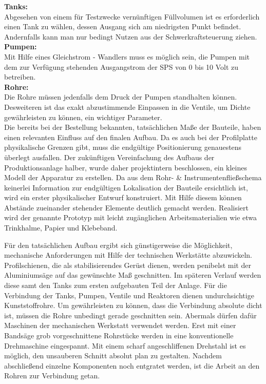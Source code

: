 	\textbf{Tanks:}\\
	Abgesehen von einem für Testzwecke vernünftigen Füllvolumen ist es erforderlich einen Tank zu wählen, dessen Ausgang sich am niedrigsten Punkt befindet. Andernfalls kann man nur bedingt Nutzen aus der Schwerkraftsteuerung ziehen.\\
	
	\textbf{Pumpen:}\\
	Mit Hilfe eines Gleichstrom - Wandlers muss es möglich sein, die Pumpen mit dem zur Verfügung stehenden Ausgangstrom der SPS von 0 bis 10 Volt zu betreiben.\\
	
	\textbf{Rohre:}\\
	Die Rohre müssen jedenfalls dem Druck der Pumpen standhalten können. Desweiteren ist das exakt abzustimmende Einpassen in die Ventile, um Dichte gewährleisten zu können, ein wichtiger Parameter.\\

	Die bereits bei der Bestellung bekannten, tatsächlichen Maße der Bauteile, haben einen relevanten Einfluss auf den finalen Aufbau. Da es auch bei der Profilplatte physikalische Grenzen gibt, muss die endgültige Positionierung genauestens überlegt ausfallen. Der zukünftigen Vereinfachung des Aufbaus der Produktionsanlage halber, wurde daher projektintern beschlossen, ein kleines Modell der Apparatur zu erstellen. Da aus dem Rohr- \& Instrumentenfließschema keinerlei Information zur endgültigen Lokalisation der Bauteile ersichtlich ist, wird ein erster physikalischer Entwurf konstruiert. Mit Hilfe diesem können Abstände zueinander stehender Elemente deutlich gemacht werden. Realisiert wird der genannte Prototyp mit leicht zugänglichen Arbeitsmaterialien wie etwa Trinkhalme, Papier und Klebeband.\\
	

	Für den tatsächlichen Aufbau ergibt sich günstigerweise die Möglichkeit, mechanische Anforderungen mit Hilfe der technischen Werkstätte abzuwickeln. Profilschienen, die als stabilisierendes Gerüst dienen, werden penibelst mit der Aluminiumsäge auf das gewünschte Maß geschnitten. Im späteren Verlauf werden diese samt den Tanks zum ersten aufgebauten Teil der Anlage. Für die Verbindung der Tanks, Pumpen, Ventile und Reaktoren dienen undurchsichtige Kunststoffrohre. Um gewährleisten zu können, dass die Verbindung absolute dicht ist, müssen die Rohre unbedingt gerade geschnitten sein. Abermals dürfen dafür Maschinen der mechanischen Werkstatt verwendet werden. Erst mit einer Bandsäge grob vorgeschnittene Rohrstücke werden in eine konventionelle Drehmaschine eingespannt. Mit einem scharf angeschliffenen Drehstahl ist es möglich, den unsauberen Schnitt absolut plan zu gestalten. Nachdem abschließend einzelne Komponenten noch entgratet werden, ist die Arbeit an den Rohren zur Verbindung getan.\\
	
